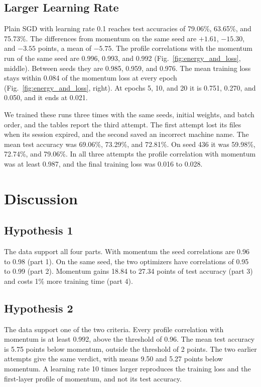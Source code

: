 \documentclass[conference]{IEEEtran}
\begin{document}
\subsection{Larger Learning Rate}
Plain SGD with learning rate 0.1 reaches test accuracies of 79.06\%, 63.65\%,
and 75.73\%. The differences from momentum on the same seed are $+1.61$,
$-15.30$, and $-3.55$ points, a mean of $-5.75$. The profile correlations with
the momentum run of the same seed are 0.996, 0.993, and 0.992
(Fig.~\ref{fig:energy_and_loss}, middle). Between seeds they are 0.985, 0.959,
and 0.976. The mean training loss stays within 0.084 of the momentum loss at
every epoch (Fig.~\ref{fig:energy_and_loss}, right). At epochs 5, 10, and 20
it is 0.751, 0.270, and 0.050, and it ends at 0.021.

We trained these runs three times with the same seeds, initial weights, and
batch order, and the tables report the third attempt. The first attempt lost
its files when its session expired, and the second saved an incorrect machine
name. The mean test accuracy was 69.06\%, 73.29\%, and 72.81\%. On seed 436
it was 59.98\%, 72.74\%, and 79.06\%. In all three attempts the profile
correlation with momentum was at least 0.987, and the final training loss was
0.016 to 0.028.

\section{Discussion}
\subsection{Hypothesis 1}
The data support all four parts. With momentum the seed correlations are 0.96
to 0.98 (part 1). On the same seed, the two optimizers have correlations of
0.95 to 0.99 (part 2). Momentum gains 18.84 to 27.34 points of test accuracy
(part 3) and costs 1\% more training time (part 4).

\subsection{Hypothesis 2}
The data support one of the two criteria. Every profile correlation with
momentum is at least 0.992, above the threshold of 0.96. The mean test
accuracy is 5.75 points below momentum, outside the threshold of 2 points. The
two earlier attempts give the same verdict, with means 9.50 and 5.27 points
below momentum. A learning rate 10 times larger reproduces the training loss
and the first-layer profile of momentum, and not its test accuracy.
\end{document}
